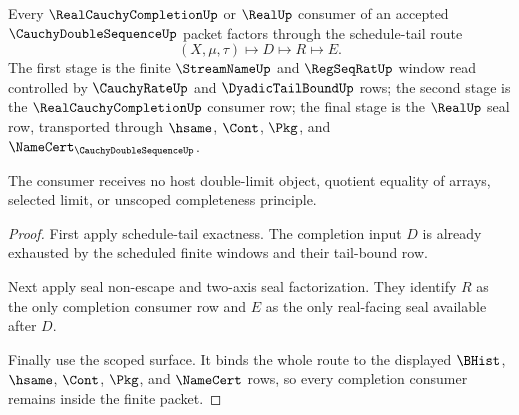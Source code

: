 \begin{theorem}
\label{thm:cauchy-double-sequence-completion-consumer-scope}
Every $\RealCauchyCompletionUp$ or $\RealUp$ consumer of an accepted $\CauchyDoubleSequenceUp$ packet factors through the schedule-tail route
$$
(X,\mu,\tau) \longmapsto D \longmapsto R \longmapsto E.
$$
The first stage is the finite $\StreamNameUp$ and $\RegSeqRatUp$ window read controlled by $\CauchyRateUp$ and $\DyadicTailBoundUp$ rows; the second stage is the $\RealCauchyCompletionUp$ consumer row; the final stage is the $\RealUp$ seal row, transported through $\hsame$, $\Cont$, $\Pkg$, and $\NameCert_{\CauchyDoubleSequenceUp}$.

The consumer receives no host double-limit object, quotient equality of arrays, selected limit, or unscoped completeness principle.
\end{theorem}
\begin{proof}
First apply schedule-tail exactness. The completion input $D$ is already exhausted by the scheduled finite windows and their tail-bound row.

Next apply seal non-escape and two-axis seal factorization. They identify $R$ as the only completion consumer row and $E$ as the only real-facing seal available after $D$.

Finally use the scoped surface. It binds the whole route to the displayed $\BHist$, $\hsame$, $\Cont$, $\Pkg$, and $\NameCert$ rows, so every completion consumer remains inside the finite packet.
\end{proof}

